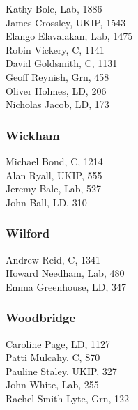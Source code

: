 \documentclass[a4paper,openany,10pt]{book}
\begin{document}


Kathy Bole, Lab, 1886\\
James Crossley, UKIP, 1543\\
Elango Elavalakan, Lab, 1475\\
Robin Vickery, C, 1141\\
David Goldsmith, C, 1131\\
Geoff Reynish, Grn, 458\\
Oliver Holmes, LD, 206\\
Nicholas Jacob, LD, 173\\


\subsubsection*{Wickham}



Michael Bond, C, 1214\\
Alan Ryall, UKIP, 555\\
Jeremy Bale, Lab, 527\\
John Ball, LD, 310\\


\subsubsection*{Wilford}



Andrew Reid, C, 1341\\
Howard Needham, Lab, 480\\
Emma Greenhouse, LD, 347\\


\subsubsection*{Woodbridge}



Caroline Page, LD, 1127\\
Patti Mulcahy, C, 870\\
Pauline Staley, UKIP, 327\\
John White, Lab, 255\\
Rachel Smith-Lyte, Grn, 122\\
\end{document}
